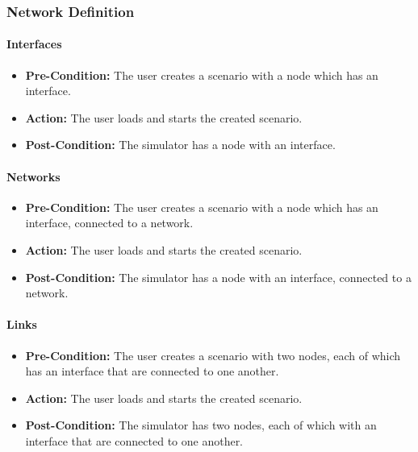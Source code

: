 \documentclass[titlepage]{article}
\newcommand{\testentry}[4]{
    \paragraph{#1}
    \begin{itemize}
        \item \textbf{Pre-Condition:} #2
        \item \textbf{Action:} #3
        \item \textbf{Post-Condition:} #4
    \end{itemize}
}
\begin{document}


\subsubsection{Network Definition}
    \testentry{Interfaces}{
        The user creates a scenario with a node which has an interface.
    }{
        The user loads and starts the created scenario.
    }{
        The simulator has a node with an interface.
    }
    \testentry{Networks}{
        The user creates a scenario with a node which has an interface, connected to a network.
    }{
        The user loads and starts the created scenario.
    }{
        The simulator has a node with an interface, connected to a network.
    }
    \testentry{Links}{
        The user creates a scenario with two nodes, each of which has an interface that are connected to one another.
    }{
        The user loads and starts the created scenario.
    }{
        The simulator has two nodes, each of which with an interface that are connected to one another.
    }
\end{document}
